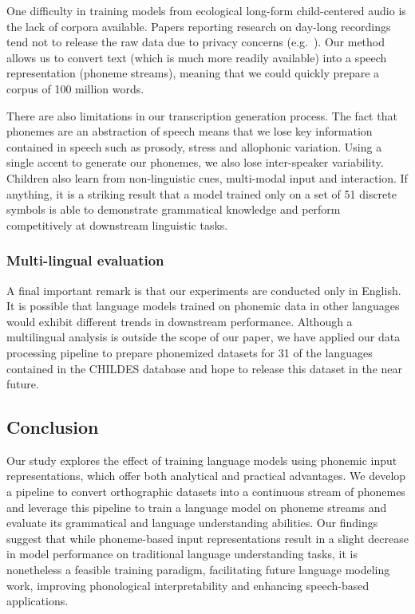One difficulty in training models from ecological long-form child-centered audio is the lack of corpora available. Papers reporting research on day-long recordings tend not to release the raw data due to privacy concerns (e.g.\ \citet{bergelson-etal-2023,leon-cristia-2024}).
Our method allows us to convert text (which is much more readily available) into a speech representation (phoneme streams), meaning that we could quickly prepare a corpus of 100 million words. 

There are also limitations in our transcription generation process. The fact that phonemes are an abstraction of speech means that we lose key information contained in speech such as prosody, stress and allophonic variation. Using a single accent to generate our phonemes, we also lose inter-speaker variability. Children also learn from non-linguistic cues, multi-modal input and interaction. If anything, it is a striking result that a model trained only on a set of 51 discrete symbols is able to demonstrate grammatical knowledge and perform competitively at downstream linguistic tasks. 


\subsubsection{Multi-lingual evaluation}
\label{sec:limitations} 

A final important remark is that our experiments are conducted only in English. It is possible that language models trained on phonemic data in other languages would exhibit different trends in downstream performance. Although a multilingual analysis is outside the scope of our paper, we have applied our data processing pipeline to prepare phonemized datasets for 31 of the languages contained in the CHILDES database and hope to release this dataset in the near future.

\subsection{Conclusion}

Our study explores the effect of training language models using phonemic input representations, which offer both analytical and practical advantages. We develop a pipeline to convert orthographic datasets into a continuous stream of phonemes and leverage this pipeline to train a language model on phoneme streams and evaluate its grammatical and language understanding abilities. Our findings suggest that while phoneme-based input representations result in a slight decrease in model performance on traditional language understanding tasks, it is nonetheless a feasible training paradigm, facilitating future language modeling work, improving phonological interpretability and enhancing speech-based applications.  

